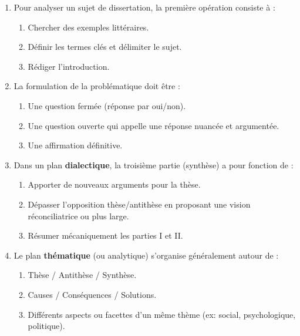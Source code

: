 \documentclass[11pt]{article}
\begin{document}
\begin{exercice}
\begin{enumerate}
    \item Pour analyser un sujet de dissertation, la première opération consiste à :
    \begin{enumerate}
        \item Chercher des exemples littéraires.
        \item Définir les termes clés et délimiter le sujet.
        \item Rédiger l'introduction.
    \end{enumerate}
    \item La formulation de la problématique doit être :
    \begin{enumerate}
        \item Une question fermée (réponse par oui/non).
        \item Une question ouverte qui appelle une réponse nuancée et argumentée.
        \item Une affirmation définitive.
    \end{enumerate}
    \item Dans un plan \textbf{dialectique}, la troisième partie (synthèse) a pour fonction de :
    \begin{enumerate}
        \item Apporter de nouveaux arguments pour la thèse.
        \item Dépasser l'opposition thèse/antithèse en proposant une vision réconciliatrice ou plus large.
        \item Résumer mécaniquement les parties I et II.
    \end{enumerate}
    \item Le plan \textbf{thématique} (ou analytique) s'organise généralement autour de :
    \begin{enumerate}
        \item Thèse / Antithèse / Synthèse.
        \item Causes / Conséquences / Solutions.
        \item Différents aspects ou facettes d'un même thème (ex: social, psychologique, politique).
    \end{enumerate}
\end{enumerate}
\end{exercice}
\end{document}
